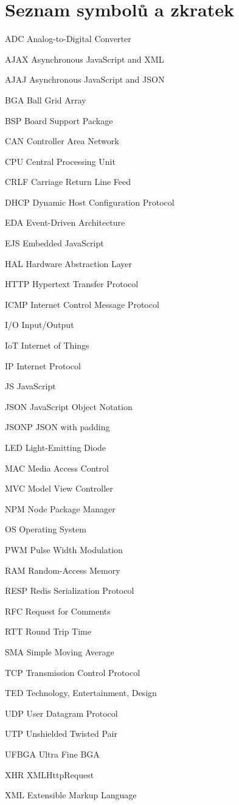 \documentclass[oneside,12pt,a4paper,final]{book} %
\makeatletter
\newcommand{\tocfill}{\cleaders\hbox{$\m@th \mkern\@dotsep mu . \mkern\@dotsep mu$}\hfill}
\newcommand{\abbrlabel}[1]{\makebox[6cm][l]{\textbf{#1}\ \tocfill}}
\newenvironment{abbreviations}{\begin{list}{}{\renewcommand{\makelabel}{\abbrlabel}%
        \setlength{\labelwidth}{6cm}\setlength{\leftmargin}{\labelwidth+\labelsep}%
                                              \setlength{\itemsep}{0pt}}}{\end{list}}
\makeatother
\begin{document}
\chapter*{Seznam symbolů a zkratek}
\noindent
\begin{abbreviations}
\item[ADC]		Analog-to-Digital Converter
\item[AJAX]		Asynchronous JavaScript and XML
\item[AJAJ]		Asynchronous JavaScript and JSON
\item[BGA]		Ball Grid Array
\item[BSP]		Board Support Package
\item[CAN]		Controller Area Network
\item[CPU]		Central Processing Unit
\item[CRLF]		Carriage Return Line Feed
\item[DHCP]		Dynamic Host Configuration Protocol
\item[EDA]		Event-Driven Architecture
\item[EJS]		Embedded JavaScript
\item[HAL]		Hardware Abstraction Layer
\item[HTTP]		Hypertext Transfer Protocol
\item[ICMP]		Internet Control Message Protocol
\item[I/O]		Input/Output
\item[IoT]		Internet of Things
\item[IP]		Internet Protocol
\item[JS]		JavaScript
\item[JSON]		JavaScript Object Notation
\item[JSONP]	JSON with padding
\item[LED]		Light-Emitting Diode
\item[MAC]		Media Access Control
\item[MVC]		Model View Controller
\item[NPM]		Node Package Manager
\item[OS]		Operating System
\item[PWM]		Pulse Width Modulation
\item[RAM]		Random-Access Memory
\item[RESP]		Redis Serialization Protocol
\item[RFC]		Request for Comments
\item[RTT]		Round Trip Time
\item[SMA]		Simple Moving Average
\item[TCP]		Transmission Control Protocol
\item[TED]		Technology, Entertainment, Design
\item[UDP]		User Datagram Protocol
\item[UTP]		Unshielded Twisted Pair
\item[UFBGA]	Ultra Fine BGA
\item[XHR]		XMLHttpRequest
\item[XML]		Extensible Markup Language
\end{abbreviations}
\end{document}
